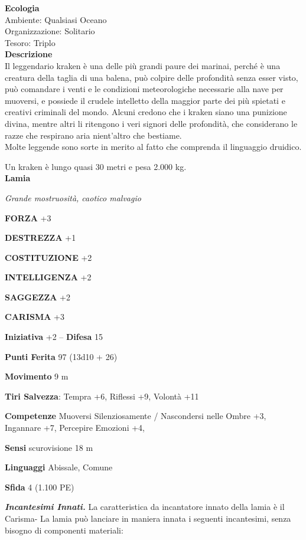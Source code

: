 \begin{multicols}{2}
\textbf{Ecologia}\\
Ambiente: Qualsiasi Oceano\\
Organizzazione: Solitario\\
Tesoro: Triplo\\
\textbf{Descrizione}\\
Il leggendario kraken è una delle più grandi paure dei marinai, perché è una creatura della taglia di una balena, può colpire delle profondità senza esser visto, può comandare i venti e le condizioni meteorologiche necessarie alla nave per muoversi, e possiede il crudele intelletto della maggior parte dei più spietati e creativi criminali del mondo. Alcuni credono che i kraken siano una punizione divina, mentre altri li ritengono i veri signori delle profondità, che considerano le razze che respirano aria nient'altro che bestiame.\\

Molte leggende sono sorte in merito al fatto che comprenda il linguaggio druidico.

Un kraken è lungo quasi 30 metri e pesa 2.000 kg.\\


\medskip{}\textbf{Lamia}

\emph{Grande mostruosità, caotico malvagio}

\textbf{FORZA} +3

\textbf{DESTREZZA} +1

\textbf{COSTITUZIONE} +2

\textbf{INTELLIGENZA} +2

\textbf{SAGGEZZA} +2

\textbf{CARISMA} +3

\textbf{Iniziativa} +2 -- \textbf{Difesa} 15

\textbf{Punti Ferita} 97 (13d10 + 26)

\textbf{Movimento} 9 m

\textbf{Tiri Salvezza}: Tempra +6, Riflessi +9, Volontà +11

\textbf{Competenze} Muoversi Silenziosamente / Nascondersi nelle Ombre +3, Ingannare +7, Percepire Emozioni +4,

\textbf{Sensi} scurovisione 18 m

\textbf{Linguaggi} Abissale, Comune

\textbf{Sfida} 4 (1.100 PE)

\emph{\textbf{Incantesimi Innati.}} La caratteristica da incantatore innato della lamia è il Carisma- La lamia può lanciare in maniera innata i seguenti incantesimi, senza bisogno di componenti materiali:


\end{multicols}
